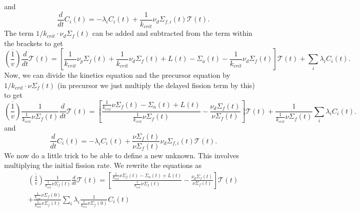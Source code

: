 \documentclass{ansconf}
\numberwithin{equation}{section}
\begin{document}
and
\begin{equation}
\frac{d}{dt}C_{i}\left(t\right)=-\lambda_{i}C_{i}\left(t\right)+\frac{1}{k_{crit}}\nu_{d}\Sigma_{f,i}\left(t\right)\mathcal{T}\left(t\right).
\end{equation}
 The term $1/k_{crit}\cdot\nu_{d}\Sigma_{f}\left(t\right)$ can be
added and subtracted from the term within the brackets to get
\begin{equation}
\overline{\left(\frac{1}{v}\right)}\frac{d}{dt}\mathcal{T}\left(t\right)=\left[\frac{1}{k_{crit}}\nu_{p}\Sigma_{f}\left(t\right)+\frac{1}{k_{crit}}\nu_{d}\Sigma_{f}\left(t\right)+L\left(t\right)-\Sigma_{a}\left(t\right)-\frac{1}{k_{crit}}\nu_{d}\Sigma_{f}\left(t\right)\right]\mathcal{T}\left(t\right)+\sum_{i}
\lambda_{i}C_{i}\left(t\right).
\end{equation}
 Now, we can divide the kinetics equation and the precursor equation
by $1/k_{crit}\cdot\nu\Sigma_{f}\left(t\right)$ (in precursor we
just multiply the delayed fission term by this) to get
\begin{equation}
\overline{\left(\frac{1}{v}\right)}\frac{1}{\frac{1}{k_{crit}}\nu\Sigma_{f}\left(t\right)}\frac{d}{dt}\mathcal{T}\left(t\right)=\left[\frac{\frac{1}{k_{crit}}\nu\Sigma_{f}\left(t\right)-\Sigma_{a}\left(t\right)+L\left(t\right)}{\frac{1}{k_{crit}}\nu\Sigma_{f}\left(t\right)}-\frac{\nu_{d}\Sigma_{f}\left(t\right)}{\nu\Sigma_{f}\left(t\right)}\right]\mathcal{T}\left(t\right)+\frac{1}{\frac{1}{k_{crit}}\nu\Sigma_{f}\left(t\right)}\sum_{i}\lambda_{i}C_{i}\left(t\right).
\end{equation}
and
\begin{equation}
\frac{d}{dt}C_{i}\left(t\right)=-\lambda_{i}C_{i}\left(t\right)+\frac{\nu\Sigma_{f}\left(t\right)}{\nu\Sigma_{f}\left(t\right)}\nu_{d}\Sigma_{f,i}\left(t\right)\mathcal{T}\left(t\right).
\end{equation}
We now do a little trick to be able to define a new unknown. This
involves multiplying the initial fission rate. We rewrite the equations
as 
\begin{multline}
\overline{\left(\frac{1}{v}\right)}\frac{1}{\frac{1}{k_{crit}}\nu\Sigma_{f}\left(t\right)}\frac{d}{dt}\mathcal{T}\left(t\right)=\left[\frac{\frac{1}{k_{crit}}\nu\Sigma_{f}\left(t\right)-\Sigma_{a}\left(t\right)+L\left(t\right)}{\frac{1}{k_{crit}}\nu\Sigma_{f}\left(t\right)}-\frac{\nu_{d}\Sigma_{f}\left(t\right)}{\nu\Sigma_{f}\left(t\right)}\right]\mathcal{T}\left(t\right)\\
+\frac{\frac{1}{k_{crit}}\nu\Sigma_{f}\left(0\right)}{\frac{1}{k_{crit}}\nu\Sigma_{f}\left(t\right)}\sum_{i}\lambda_{i}\frac{1}{\frac{1}{k_{crit}}\nu\Sigma_{f}\left(0\right)}C_{i}\left(t\right)
\end{multline}
\end{document}

